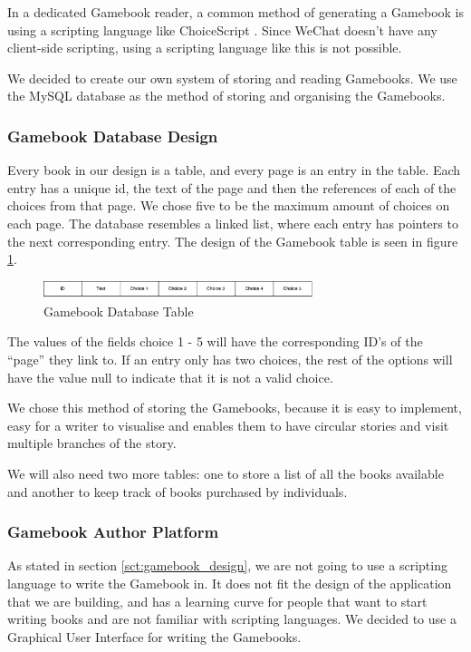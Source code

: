 In a dedicated Gamebook reader, a common method of generating a Gamebook is using a scripting language like ChoiceScript \cite{LLC}. Since WeChat doesn't have any client-side scripting, using a scripting language like this is not possible. 

We decided to create our own system of storing and reading Gamebooks. We use the MySQL database as the method of storing and organising the Gamebooks.

\subsubsection{Gamebook Database Design}

Every book in our design is a table, and every page is an entry in the table. Each entry has a unique id, the text of the page and then the references of each of the choices from that page. We chose five to be the maximum amount of choices on each page. The database resembles a linked list, where each entry has pointers to the next corresponding entry. The design of the Gamebook table is seen in figure \ref{fig:gamebook_database}.

\begin{figure}
  \centering
    \includegraphics[width=0.7\textwidth]{figs/Gamebook_Database.pdf}
   \caption{Gamebook Database Table} 
   \label{fig:gamebook_database}
\end{figure}

The values of the fields choice 1 - 5 will have the corresponding ID's of the ``page'' they link to. If an entry only has two choices, the rest of the options will have the value null to indicate that it is not a valid choice.

We chose this method of storing the Gamebooks, because it is easy to implement, easy for a writer to visualise and enables them to have circular stories and visit multiple branches of the story. 

We will also need two more tables: one to store a list of all the books available and another to keep track of books purchased by individuals. 

\subsubsection{Gamebook Author Platform}

As stated in section \ref{sct:gamebook_design}, we are not going to use a scripting language to write the Gamebook in. It does not fit the design of the application that we are building, and has a learning curve for people that want to start writing books and are not familiar with scripting languages. We decided to use a Graphical User Interface for writing the Gamebooks.

